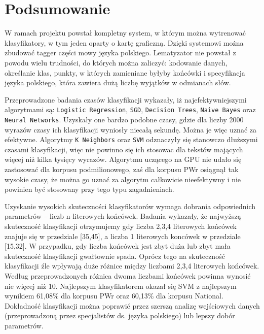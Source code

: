 \section{Podsumowanie}

W ramach projektu powstał kompletny system, w którym można wytrenować klasyfikatory, w tym jeden oparty o kartę graficzną. Dzięki systemowi można zbudować tagger części mowy języka polskiego. Lematyzator nie powstał z powodu wielu trudności, do których można zaliczyć: kodowanie danych, określanie klas, punkty, w których zamieniane byłyby końcówki i specyfikacja języka polskiego, która zawiera dużą liczbę wyjątków w odmianach słów.

Przeprowadzone badania czasów klasyfikacji wykazały, iż najefektywniejszymi algorytmami są: \texttt{Logistic Regression}, \texttt{SGD}, \texttt{Decision Trees}, \texttt{Naive Bayes} oraz \texttt{Neural Networks}. Uzyskały one bardzo podobne czasy, gdzie dla liczby 2000 wyrazów czasy ich klasyfikacji wyniosły niecałą sekundę. Można je więc uznać za efektywne. Algorytmy \texttt{K Neighbors} oraz \texttt{SVM} odznaczyły się stanowczo dłuższymi czasami klasyfikacji, więc nie powinno się ich stosowac dla tekstów mających więcej niż kilka tysięcy wyrazów. Algorytmu uczącego na GPU nie udało się zastosować dla korpusu podmilionowego, zaś dla korpusu PWr osiągnął tak wysokie czasy, że można go uznać za algorytm całkowicie nieefektywny i nie powinien być stosowany przy tego typu zagadnieniach.

Uzyskanie wysokich skuteczności klasyfikatorów wymaga dobrania odpowiednich parametrów -- liczb n-literowych końcówek. Badania wykazały, że najwyższą skuteczność klasyfikacji otrzymujemy gdy liczba 2,3,4 literowych końcówek znajuje się w przedziale [35,45], a liczba 1 literowych koncówek w przedziale [15,32]. W przypadku, gdy liczba końcówek jest zbyt duża lub zbyt mała skuteczność klasyfikacji gwałtownie spada. Oprócz tego na skuteczność klasyfikacji źle wpływają duże różnice między liczbami 2,3,4 literowych końcówek. Według przeprowadzonych różnica dwoma liczbami końcówek powinna wynosić nie więcej niż 10. Najlepszym klasyfikatorem okazał się SVM z najlepszym wynikiem 61,08\% dla korpusu PWr oraz 60,13\% dla korpusu National. Dokładność klasyfikacji można poprawić przez szerszą analizę wejściowych danych (przeprowadzoną przez specjalistów ds. języka polskiego) lub lepszy dobór parametrów.  

